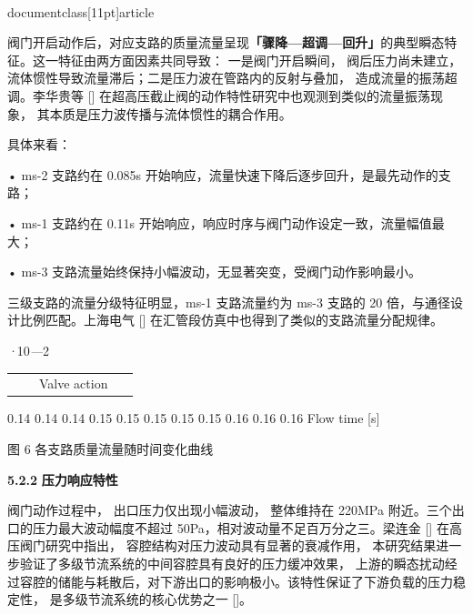 \\documentclass[11pt]{article}
\begin{document}
阀门开启动作后，对应支路的质量流量呈现\textbf{「骤降—超调—回升」}的典型瞬态特征。这一特征由两方面因素共同导致： 一是阀门开启瞬间， 阀后压力尚未建立， 流体惯性导致流量滞后；二是压力波在管路内的反射与叠加， 造成流量的振荡超调。李华贵等 [\cite{fe880629_9ce4_4876_a173_e24a97d827f4_基于数字孪生的管道阀门监测技术研究_谭宗豪}]  在超高压截止阀的动作特性研究中也观测到类似的流量振荡现象， 其本质是压力波传播与流体惯性的耦合作用。\par

具体来看：\par

•  ms-2 支路约在 0.085s 开始响应，流量快速下降后逐步回升，是最先动作的支路；\par

•  ms-1 支路约在 0.11s 开始响应，响应时序与阀门动作设定一致，流量幅值最大；\par

•  ms-3 支路流量始终保持小幅波动，无显著突变，受阀门动作影响最小。\par

三级支路的流量分级特征明显，ms-1 支路流量约为 ms-3 支路的 20 倍，与通径设计比例匹配。上海电气 [\cite{fe880629_9ce4_4876_a173_e24a97d827f4_基于数字孪生的管道阀门监测技术研究_谭宗豪}]  在汇管段仿真中也得到了类似的支路流量分配规律。\par

\textit{·}10\textit{—}2\par

\par
\begin{tabular}{|c|c|c|c|}\n\hline\n &  & Valve action      &  \ \hline\n\end{tabular}
0\textit{.}14     0\textit{.}14      0\textit{.}14     0\textit{.}15      0\textit{.}15     0\textit{.}15      0\textit{.}15      0\textit{.}15     0\textit{.}16      0\textit{.}16     0\textit{.}16 Flow time [s]\par

图 6    各支路质量流量随时间变化曲线\par

\par
\textbf{5.2.2    }\textbf{压力响应特性}\par

阀门动作过程中， 出口压力仅出现小幅波动， 整体维持在 220MPa 附近。三个出口的压力最大波动幅度不超过 50Pa，相对波动量不足百万分之三。梁连金 [\cite{fe880629_9ce4_4876_a173_e24a97d827f4_基于数字孪生的管道阀门监测技术研究_谭宗豪}]  在高压阀门研究中指出， 容腔结构对压力波动具有显著的衰减作用， 本研究结果进一步验证了多级节流系统的中间容腔具有良好的压力缓冲效果， 上游的瞬态扰动经过容腔的储能与耗散后，对下游出口的影响极小。该特性保证了下游负载的压力稳定性， 是多级节流系统的核心优势之一 [\cite{fe880629_9ce4_4876_a173_e24a97d827f4_基于数字孪生的管道阀门监测技术研究_谭宗豪}]。\par
\end{document}
